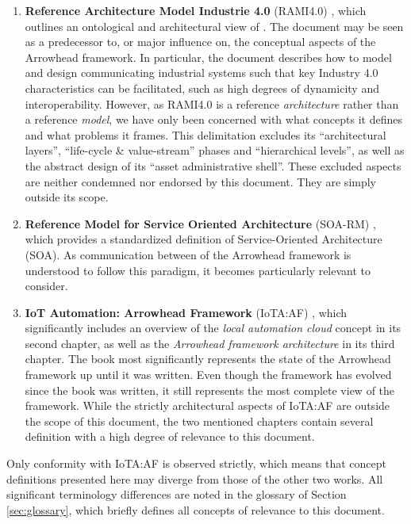 \begin{enumerate}
\item \textbf{Reference Architecture Model Industrie 4.0} (RAMI4.0) \cite{adolphs2016reference}, which outlines an ontological and architectural view of .
The document may be seen as a predecessor to, or major influence on, the conceptual aspects of the Arrowhead framework.
In particular, the document describes how to model and design communicating industrial systems such that key Industry 4.0 characteristics can be facilitated, such as high degrees of dynamicity and interoperability.
However, as RAMI4.0 is a reference \textit{architecture} rather than a reference \textit{model}, we have only been concerned with what concepts it defines and what problems it frames.
This delimitation excludes its ``architectural layers'', ``life-cycle \& value-stream'' phases and ``hierarchical levels'', as well as the abstract design of its ``asset administrative shell''.
These excluded aspects are neither condemned nor endorsed by this document.
They are simply outside its scope.

\item \textbf{Reference Model for Service Oriented Architecture} (SOA-RM) \cite{mackenzie2006reference}, which provides a standardized definition of Service-Oriented Architecture (SOA).
As communication between  of the Arrowhead framework is understood to follow this paradigm, it becomes particularly relevant to consider.

\item \textbf{IoT Automation: Arrowhead Framework} (IoTA:AF) \cite{delsing2017iot}, which significantly includes an overview of the \textit{local automation cloud} concept in its second chapter, as well as the \textit{Arrowhead framework architecture} in its third chapter.
The book most significantly represents the state of the Arrowhead framework up until it was written.
Even though the framework has evolved since the book was written, it still represents the most complete view of the framework.
While the strictly architectural aspects of IoTA:AF are outside the scope of this document, the two mentioned chapters contain several definition with a high degree of relevance to this document.

\end{enumerate}

Only conformity with IoTA:AF is observed strictly, which means that concept definitions presented here may diverge from those of the other two works.
All significant terminology differences are noted in the glossary of Section \ref{sec:glossary}, which briefly defines all concepts of relevance to this document.

